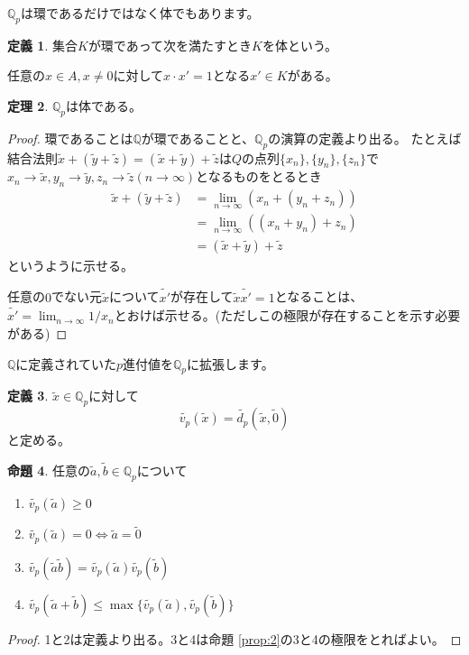 \documentclass[uplatex]{jsarticle}
\newcommand{\Q}{\mathbb{Q}}
\theoremstyle{definition} %
\newtheorem{thm}{定理}
\newtheorem{defi}[thm]{定義}
\newtheorem{prop}[thm]{命題}
\begin{document}
$\Q_p$は環であるだけではなく体でもあります。

\begin{oframed}\begin{defi}
集合$K$が環であって次を満たすとき$K$を体という。

任意の$x \in A, x \ne 0$に対して$x \cdot x' = 1$となる$x' \in K$がある。
\end{defi}\end{oframed}

\begin{oframed}\begin{thm}
$\Q_p$は体である。
\end{thm}\end{oframed}
\begin{proof}
環であることは$\Q$が環であることと、$\Q_p$の演算の定義より出る。
たとえば結合法則$\tilde{x} + (\tilde{y} + \tilde{z}) = (\tilde{x} + \tilde{y}) + \tilde{z}$は$Q$の点列$\{x_n\}, \{y_n\}, \{z_n\}$で$x_n \to \tilde{x}, y_n \to \tilde{y}, z_n \to \tilde{z} (n \to \infty)$となるものをとるとき
\begin{align*}
\tilde{x} + (\tilde{y} + \tilde{z}) &= \lim_{n\to\infty} (x_n + (y_n + z_n)) \\
 &= \lim_{n\to\infty} ((x_n + y_n) + z_n) \\
 &= (\tilde{x} + \tilde{y}) + \tilde{z}
\end{align*}
というように示せる。

任意の$0$でない元$\tilde{x}$について$\tilde{x'}$が存在して$\tilde{x} \tilde{x'} = 1$となることは、$\tilde{x'} = \lim_{n\to\infty}{1/x_n}$とおけば示せる。(ただしこの極限が存在することを示す必要がある)
\end{proof}

$\Q$に定義されていた$p$進付値を$\Q_p$に拡張します。

\begin{oframed}\begin{defi}
$\tilde{x} \in \Q_p$に対して
\[\tilde{v_p}(\tilde{x}) = \tilde{d_p}(\tilde{x}, \tilde{0})\]
と定める。
\end{defi}\end{oframed}

\begin{oframed}\begin{prop}\label{prop:4}
任意の$\tilde{a}, \tilde{b} \in \Q_p$について
\begin{enumerate}
\item $\tilde{v_p}(\tilde{a}) \geq 0$
\item $\tilde{v_p}(\tilde{a}) = 0 \iff \tilde{a} = \tilde{0}$
\item $\tilde{v_p}(\tilde{a}\tilde{b}) = \tilde{v_p}(\tilde{a}) \tilde{v_p}(\tilde{b})$
\item $\tilde{v_p}(\tilde{a}+\tilde{b}) \leq \max\{\tilde{v_p}(\tilde{a}), \tilde{v_p}(\tilde{b})\}$
\end{enumerate}
\end{prop}\end{oframed}
\begin{proof}
1と2は定義より出る。3と4は命題 \ref{prop:2}の3と4の極限をとればよい。
\end{proof}
\end{document}
